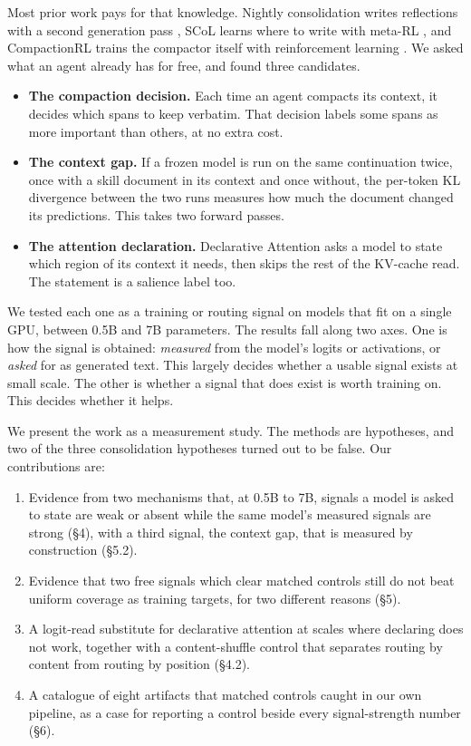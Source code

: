 \documentclass[10pt]{article}
\providecommand{\tightlist}{\setlength{\itemsep}{0pt}\setlength{\parskip}{0pt}}
\begin{document}
Most prior work pays for that knowledge. Nightly consolidation writes
reflections with a second generation pass \citep{dennis2026beyond}, SCoL learns where to write with meta-RL \citep{wang2026scol},
and CompactionRL trains the compactor itself with reinforcement learning \citep{li2026compactionrl}. We asked what
an agent already has for free, and found three candidates.

\begin{itemize}
\tightlist
\item
  \textbf{The compaction decision.} Each time an agent compacts its context, it decides which
  spans to keep verbatim. That decision labels some spans as more important than others, at
  no extra cost.
\item
  \textbf{The context gap.} If a frozen model is run on the same continuation twice, once with a
  skill document in its context and once without, the per-token KL divergence between the
  two runs measures how much the document changed its predictions. This takes two forward
  passes.
\item
  \textbf{The attention declaration.} Declarative Attention \citep{ho2026attention} asks a model to state which region
  of its context it needs, then skips the rest of the KV-cache read. The statement is a
  salience label too.
\end{itemize}

We tested each one as a training or routing signal on models that fit on a single GPU,
between 0.5B and 7B parameters. The results fall along two axes. One is how the signal is
obtained: \emph{measured} from the model's logits or activations, or \emph{asked} for as generated
text. This largely decides whether a usable signal exists at small scale. The other is
whether a signal that does exist is worth training on. This decides whether it helps.

We present the work as a measurement study. The methods are hypotheses, and two of the
three consolidation hypotheses turned out to be false. Our contributions are:

\begin{enumerate}
\def\labelenumi{\arabic{enumi}.}
\tightlist
\item
  Evidence from two mechanisms that, at 0.5B to 7B, signals a model is asked to state are
  weak or absent while the same model's measured signals are strong (§4), with a third
  signal, the context gap, that is measured by construction (§5.2).
\item
  Evidence that two free signals which clear matched controls still do not beat uniform
  coverage as training targets, for two different reasons (§5).
\item
  A logit-read substitute for declarative attention at scales where declaring does not
  work, together with a content-shuffle control that separates routing by content from
  routing by position (§4.2).
\item
  A catalogue of eight artifacts that matched controls caught in our own pipeline, as a case
  for reporting a control beside every signal-strength number (§6).
\end{enumerate}
\end{document}
